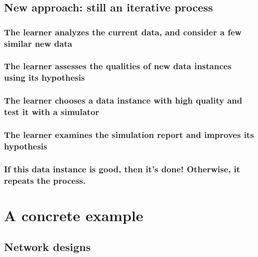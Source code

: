 \documentclass[12pt]{article}
\theoremstyle{definition}
\begin{document}
\subsection{New approach: still an iterative process}
\subsubsection{The learner analyzes the current data, and consider a few similar new data}
\subsubsection{The learner assesses the qualities of new data instances using its hypothesis}
\subsubsection{The learner chooses a data instance with high quality and test it with a simulator}
\subsubsection{The learner examines the simulation report and improves its hypothesis}
\subsubsection{If this data instance is good, then it's done! Otherwise, it repeats the process.}
\pagebreak

\section{A concrete example}
\subsection{Network designs}
\begin{figure}[h]
  \centering
  \begin{subfigure}
    {\texttt{[image: graph2.png]}}
  \end{subfigure}
  \begin{subfigure}
    {\texttt{[image: graph3.png]}}
  \end{subfigure}
\end{figure}
\begin{figure}[h]
  \centering
  \begin{subfigure}
    {\texttt{[image: graph4.png]}}
  \end{subfigure}
  \begin{subfigure}
    {\texttt{[image: graph5.png]}}
  \end{subfigure}
\end{figure}
\pagebreak
\end{document}
